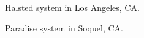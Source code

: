 \documentclass[twocolumn,10pt]{asme2ej}
\begin{document}
\begin{figure}[h!]
\begin{center}
\end{center}
\caption{Halsted system in Los Angeles, CA.}
\label{fig:halsted}
\end{figure}

\begin{figure}[h!]
\begin{center}
\end{center}
\caption{Paradise system in Soquel, CA.}
\label{fig:paradise}
\end{figure}
\end{document}
